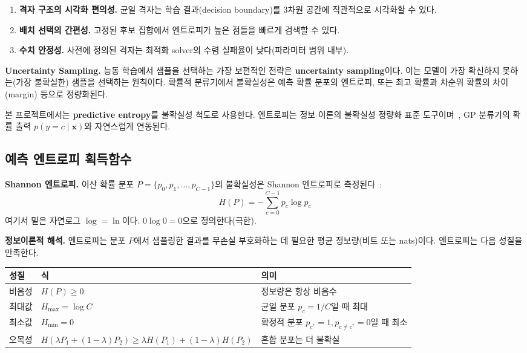 \documentclass[11pt]{article}
\begin{document}
\begin{enumerate}[label=\arabic*.]
  \item \textbf{격자 구조의 시각화 편의성.} 균일 격자는 학습 결과(decision boundary)를 3차원 공간에 직관적으로 시각화할 수 있다.
  \item \textbf{배치 선택의 간편성.} 고정된 후보 집합에서 엔트로피가 높은 점들을 빠르게 검색할 수 있다.
  \item \textbf{수치 안정성.} 사전에 정의된 격자는 최적화 solver의 수렴 실패율이 낮다(파라미터 범위 내부).
\end{enumerate}

\textbf{Uncertainty Sampling.} 능동 학습에서 샘플을 선택하는 가장 보편적인 전략은 \textbf{uncertainty sampling}이다. 이는 모델이 가장 확신하지 못하는(가장 불확실한) 샘플을 선택하는 원칙이다. 확률적 분류기에서 불확실성은 예측 확률 분포의 엔트로피, 또는 최고 확률과 차순위 확률의 차이(margin) 등으로 정량화된다.

본 프로젝트에서는 \textbf{predictive entropy}를 불확실성 척도로 사용한다. 엔트로피는 정보 이론의 불확실성 정량화 표준 도구이며~\cite{Shannon1948}, GP 분류기의 확률 출력 $p(y = c \mid \mathbf{x})$와 자연스럽게 연동된다.


\subsection{예측 엔트로피 획득함수}

\textbf{Shannon 엔트로피.} 이산 확률 분포 $P = \{p_0, p_1, \dots, p_{C-1}\}$의 불확실성은 Shannon 엔트로피로 측정된다~\cite{Shannon1948}:
\begin{equation}\label{eq:shannon-entropy}
H(P) = -\sum_{c=0}^{C-1} p_c \log p_c
\end{equation}
여기서 밑은 자연로그 $\log = \ln$이다. $0 \log 0 = 0$으로 정의한다(극한).

\textbf{정보이론적 해석.} 엔트로피는 분포 $P$에서 샘플링한 결과를 무손실 부호화하는 데 필요한 평균 정보량(비트 또는 nats)이다. 엔트로피는 다음 성질을 만족한다.

\begin{table}[htbp]
\centering
\small
\begin{tabular}{@{}lll@{}}
\toprule
성질 & 식 & 의미 \\
\midrule
비음성 & $H(P) \geq 0$ & 정보량은 항상 비음수 \\
최대값 & $H_{\text{max}} = \log C$ & 균일 분포 $p_c = 1/C$일 때 최대 \\
최소값 & $H_{\text{min}} = 0$ & 확정적 분포 $p_{c^*} = 1, p_{c \neq c^*} = 0$일 때 최소 \\
오목성 & $H(\lambda P_1 + (1-\lambda)P_2) \geq \lambda H(P_1) + (1-\lambda) H(P_2)$ & 혼합 분포는 더 불확실 \\
\bottomrule
\end{tabular}
\end{table}
\end{document}
